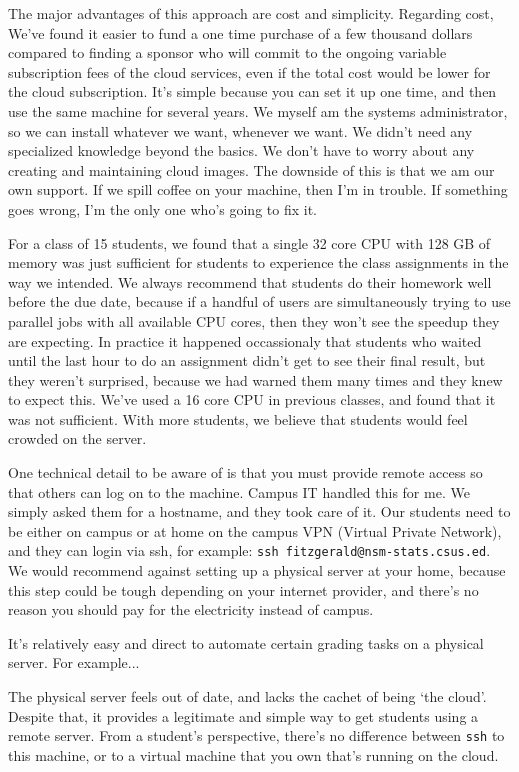 \documentclass[12pt]{article}
\begin{document}
The major advantages of this approach are cost and simplicity.
Regarding cost, We've found it easier to fund a one time purchase of a few thousand dollars compared to finding a sponsor who will commit to the ongoing variable subscription fees of the cloud services, even if the total cost would be lower for the cloud subscription.
It's simple because you can set it up one time, and then use the same machine for several years.
We myself am the systems administrator, so we can install whatever we want, whenever we want.
We didn't need any specialized knowledge beyond the basics.
We don't have to worry about any creating and maintaining cloud images.
The downside of this is that we am our own support.
If we spill coffee on your machine, then I'm in trouble.
If something goes wrong, I'm the only one who's going to fix it.

For a class of 15 students, we found that a single 32 core CPU with 128 GB of memory was just sufficient for students to experience the class assignments in the way we intended.
We always recommend that students do their homework well before the due date, because if a handful of users are simultaneously trying to use parallel jobs with all available CPU cores, then they won't see the speedup they are expecting.
In practice it happened occassionaly that students who waited until the last hour to do an assignment didn't get to see their final result, but they weren't surprised, because we had warned them many times and they knew to expect this.
We've used a 16 core CPU in previous classes, and found that it was not sufficient.
With more students, we believe that students would feel crowded on the server.

One technical detail to be aware of is that you must provide remote access so that others can log on to the machine.
Campus IT handled this for me.
We simply asked them for a hostname, and they took care of it.
Our students need to be either on campus or at home on the campus VPN (Virtual Private Network), and they can login via ssh, for example: \texttt{ssh fitzgerald@nsm-stats.csus.ed}.
We would recommend against setting up a physical server at your home, because this step could be tough depending on your internet provider, and there's no reason you should pay for the electricity instead of campus.

It's relatively easy and direct to automate certain grading tasks on a physical server.
For example...

The physical server feels out of date, and lacks the cachet of being `the cloud'.
Despite that, it provides a legitimate and simple way to get students using a remote server.
From a student's perspective, there's no difference between \texttt{ssh} to this machine, or to a virtual machine that you own that's running on the cloud.
\end{document}
